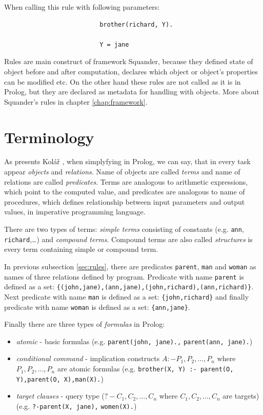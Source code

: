 \documentclass[11pt,twoside,a4paper]{book}
\begin{document}
When calling this rule with following parameters:
\begin{verbatim}
                          brother(richard, Y).
                          
                          Y = jane
\end{verbatim}
Rules are main construct of framework Squander, because they defined state of
object before and after computation, declares which object or object's
properties can be modified etc. On the other hand these rules are not called as
it is in Prolog, but they are declared as metadata for handling with objects.
More about Squander's rules in chapter \ref{chap:framework}.

\section{Terminology}
As presents Kolář \cite{kolar:jui}, when simplyfying in Prolog, we can say,
that in every task appear \textit{objects} and \textit{relations}. Name of objects are called
\textit{terms} and name of relations are called \textit{predicates}. Terms are
analogous to arithmetic expressions, which point to the computed value, and
predicates are analogous to name of procedures, which defines relationship
between input parameters and output values, in imperative programming language.

There are two types of terms: \textit{simple terms} consisting of constants
(e.g. \verb|ann|, \verb|richard|,\ldots) and \textit{compound terms}. Compound
terms are also called \textit{structures} is every term containing simple
or compound term.

In previous subsection \ref{sec:rules}, there are predicates \verb|parent|,
\verb|man| and \verb|woman| as names of three relations defined by program.
Predicate with name \verb|parent| is defined as a set:
\verb|{(john,jane),(ann,jane),(john,richard),(ann,richard)}|. Next predicate
with name \verb|man| is defined as a set:
\verb|{john,richard}| and finally predicate
with name \verb|woman| is defined as a set:
\verb|{ann,jane}|. 

Finally there are three types of \textit{formulas} in Prolog:
\begin{itemize}
  \item \textit{atomic} - basic formulas (e.g. \verb|parent(john, jane).,|
  \verb|parent(ann, jane).|)
  \item \textit{conditional command} - implication constructs $A :- P_1,
  P_2,\ldots, P_n$ where $P_1, P_2,\ldots, P_n$ are atomic formulas
  (e.g. \verb|brother(X, Y) :- parent(O, Y),parent(O, X),man(X).|)
  \item \textit{target clauses} - query type ($?-C_1, C_2,\ldots, C_n$ where
  $C_1, C_2,\ldots, C_n$ are targets)\\ (e.g. \verb|?-parent(X, jane),|
  \verb|women(X).|)
\end{itemize} 
\end{document}
